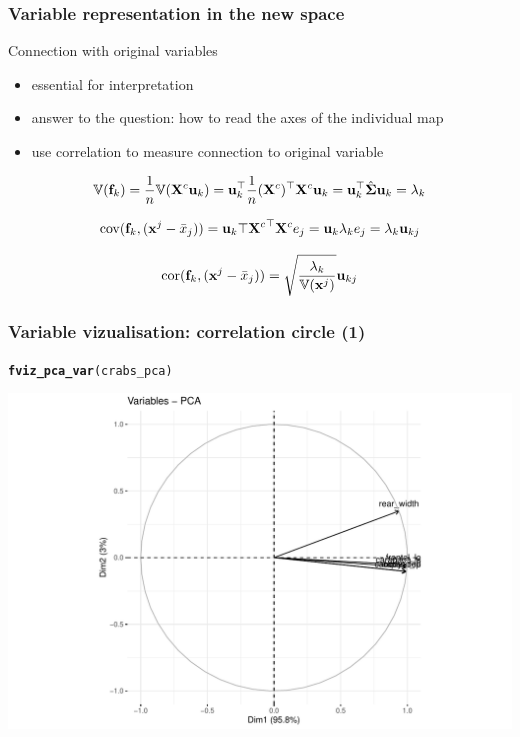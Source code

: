 \documentclass{beamer}\usepackage[]{graphicx}\usepackage[]{color}
\makeatletter
\newcommand{\hlstd}[1]{\textcolor[rgb]{0.345,0.345,0.345}{#1}}%
\newcommand{\hlkwd}[1]{\textcolor[rgb]{0.737,0.353,0.396}{\textbf{#1}}}%
\newenvironment{kframe}{%
 \def\at@end@of@kframe{}%
 \ifinner\ifhmode%
  \def\at@end@of@kframe{\end{minipage}}%
  \begin{minipage}{\columnwidth}%
 \fi\fi%
 \def\FrameCommand##1{\hskip\@totalleftmargin \hskip-\fboxsep
 \colorbox{shadecolor}{##1}\hskip-\fboxsep
     \hskip-\linewidth \hskip-\@totalleftmargin \hskip\columnwidth}%
 \MakeFramed {\advance\hsize-\width
   \@totalleftmargin\z@ \linewidth\hsize
   \@setminipage}}%
 {\par\unskip\endMakeFramed%
 \at@end@of@kframe}
\newenvironment{knitrout}{}{} %
\makeatother
\begin{document}
\begin{frame}
  \frametitle{Variable representation in the new space}
  
  \begin{block}{Connection with original variables}
    \begin{itemize}
      \item essential for interpretation
      \item answer to the question: how to read the axes of the individual map
      \item use correlation to measure connection to original variable
    \end{itemize}
  \end{block}

  \begin{equation*}
    \mathbb{V}(\mathbf{f}_k) = \frac{1}{n}\mathbb{V}(\mathbf{X}^c \mathbf{u}_k) = \mathbf{u}_k^\top \frac{1}{n}(\mathbf{X}^c)^\top \mathbf{X}^c \mathbf{u}_k =  \mathbf{u}_k^\top \hat{\boldsymbol{\Sigma}} \mathbf{u}_k = \lambda_k
  \end{equation*}
  
  \begin{equation*}
    \mathrm{cov}(\mathbf{f}_k, (\mathbf{x}^j - \bar{x}_j)) = \mathbf{u}_k \top {\mathbf{X}^c}^\top \mathbf{X}^c e_j = \mathbf{u}_k \lambda_k e_j = \lambda_k \mathbf{u}_{kj}   
  \end{equation*}

  \begin{equation*}
    \mathrm{cor}(\mathbf{f}_k, (\mathbf{x}^j - \bar{x}_j)) =  \sqrt{\frac{\lambda_k}{\mathbb{V}(\mathbf{x}^j)}}\mathbf{u}_{kj}
  \end{equation*}
  
\end{frame}

\begin{frame}[fragile]
  \frametitle{Variable vizualisation: correlation circle (1)}

\begin{knitrout}\scriptsize
{}\color{fgcolor}\begin{kframe}
\begin{alltt}
\hlkwd{fviz_pca_var}\hlstd{(crabs_pca)}
\end{alltt}
\end{kframe}
\includegraphics[width=.8\textwidth]{figures/pca_crabs_varmap1-1} 

\end{knitrout}

\end{frame}
\end{document}

